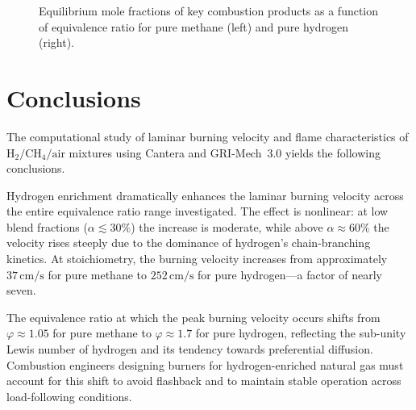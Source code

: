 \documentclass[12pt,a4paper]{article}
\newcommand{\phisym}{\varphi}
\newcommand{\alphasym}{\alpha}
\begin{document}
\begin{figure}[H]
\begin{subfigure}[t]{0.48\textwidth}
\end{subfigure}
\caption{Equilibrium mole fractions of key combustion products as a function of equivalence ratio for pure methane (left) and pure hydrogen (right).}
\label{fig:species}
\end{figure}

\section{Conclusions}

The computational study of laminar burning velocity and flame characteristics of \(\mathrm{H_2}/\mathrm{CH_4}/\mathrm{air}\) mixtures using Cantera and GRI-Mech~3.0 yields the following conclusions.

Hydrogen enrichment dramatically enhances the laminar burning velocity across the entire equivalence ratio range investigated. The effect is nonlinear: at low blend fractions (\(\alphasym \lesssim 30\%\)) the increase is moderate, while above \(\alphasym \approx 60\%\) the velocity rises steeply due to the dominance of hydrogen's chain-branching kinetics. At stoichiometry, the burning velocity increases from approximately \(37\,\mathrm{cm/s}\) for pure methane to \(252\,\mathrm{cm/s}\) for pure hydrogen---a factor of nearly seven.

The equivalence ratio at which the peak burning velocity occurs shifts from \(\phisym \approx 1.05\) for pure methane to \(\phisym \approx 1.7\) for pure hydrogen, reflecting the sub-unity Lewis number of hydrogen and its tendency towards preferential diffusion. Combustion engineers designing burners for hydrogen-enriched natural gas must account for this shift to avoid flashback and to maintain stable operation across load-following conditions.
\end{document}
